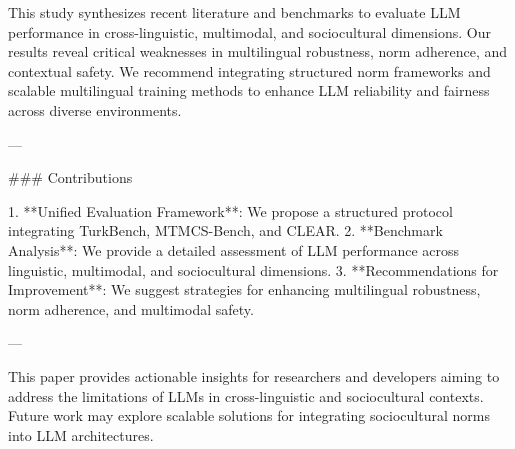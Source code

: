 This study synthesizes recent literature and benchmarks to evaluate LLM performance in cross-linguistic, multimodal, and sociocultural dimensions. Our results reveal critical weaknesses in multilingual robustness, norm adherence, and contextual safety. We recommend integrating structured norm frameworks and scalable multilingual training methods to enhance LLM reliability and fairness across diverse environments.

---

### Contributions

1. **Unified Evaluation Framework**: We propose a structured protocol integrating TurkBench, MTMCS-Bench, and CLEAR.
2. **Benchmark Analysis**: We provide a detailed assessment of LLM performance across linguistic, multimodal, and sociocultural dimensions.
3. **Recommendations for Improvement**: We suggest strategies for enhancing multilingual robustness, norm adherence, and multimodal safety.

--- 

This paper provides actionable insights for researchers and developers aiming to address the limitations of LLMs in cross-linguistic and sociocultural contexts. Future work may explore scalable solutions for integrating sociocultural norms into LLM architectures.